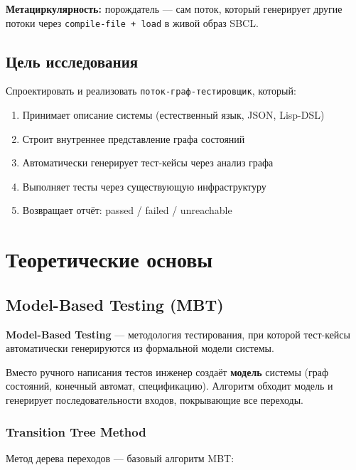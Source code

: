 \documentclass[10pt, oneside]{article}
\begin{document}
\textbf{Метациркулярность:} порождатель --- сам поток, который генерирует
другие потоки через \texttt{compile-file + load} в живой образ SBCL.

\subsection{Цель исследования}

Спроектировать и реализовать \texttt{поток-граф-тестировщик}, который:

\begin{enumerate}[leftmargin=1.5em]
  \item Принимает описание системы (естественный язык, JSON, Lisp-DSL)
  \item Строит внутреннее представление графа состояний
  \item Автоматически генерирует тест-кейсы через анализ графа
  \item Выполняет тесты через существующую инфраструктуру
  \item Возвращает отчёт: passed / failed / unreachable
\end{enumerate}

\section{Теоретические основы}

\subsection{Model-Based Testing (MBT)}

\textbf{Model-Based Testing} --- методология тестирования, при которой
тест-кейсы автоматически генерируются из формальной модели системы.

\begin{infobox}[title={Ключевая идея MBT}]
Вместо ручного написания тестов инженер создаёт \textbf{модель} системы
(граф состояний, конечный автомат, спецификацию). Алгоритм обходит модель
и генерирует последовательности входов, покрывающие все переходы.
\end{infobox}

\subsubsection{Transition Tree Method}

Метод дерева переходов --- базовый алгоритм MBT:
\end{document}
